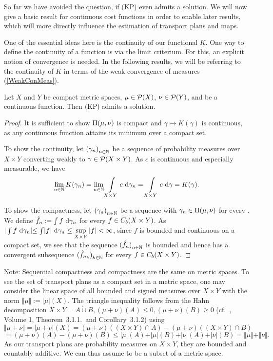 So far we have avoided the question, if (KP) even admits a solution. We will now give a basic result for continuous cost functions in order to enable later results, which will more directly influence the estimation of transport plans and maps.

One of the essential ideas here is the continuity of our functional $K$. One way to define the continuity of a function is via the limit criterium. For this, an explicit notion of convergence is needed. In the following results, we will be referring to the continuity of $K$ in terms of the weak convergence of measures (\ref{WeakConMeas}).

\begin{lemma}\label{KPAdmitCompCont}
	Let $X$ and $Y$ be compact metric spaces, $\mu \in \PM{X}$, $\nu \in \PM{Y}$, and  be a continuous function. Then$\text{\normalfont\ (KP)\,}$admits a solution.
\end{lemma}

\begin{proof}
	It is sufficient to show $\TP{\mu}{\nu}$ is compact and $\gamma \mapsto K(\gamma)$ is continuous, as any continuous function attains its minimum over a compact set.

	To show the continuity, let ${(\gamma_n)}_{\NinN}$ be a sequence of probability measures over $X \times Y$ converting weakly to $\gamma \in \PM{X \times Y}$. As $c$ is continuous and especially measurable, we have
	\[ \lim\limits_{\NinN} K(\gamma_n) = \lim\limits_{\NinN} \int\limits_{X \times Y} c~\D[\gamma_n] = \int\limits_{X \times Y} c~\D[\gamma] = K(\gamma). \] 
	
	To show the compactness, let ${(\gamma_n)}_{\NinN}$ be a sequence with $\gamma_n \in \TP{\mu}{\nu}$ for every \NinN. We define $\hat{f}_n := \int f~\D[\gamma_n]$ for every $f \in \CF[b]{X \times Y}$. As $\rvert \int f~\D[\gamma_n] \lvert \le \int \lvert f \rvert~\D[\gamma_n] \le \sup\limits_{X \times Y} |f| < \infty$, since $f$ is bounded and continuous on a compact set, we see that the sequence ${(\hat{f}_n)}_{\NinN}$ is bounded and hence has a convergent subsequence ${(\hat{f}_{n_k})}_{\NinN[k]}$ for every $f \in \CF[b]{X \times Y}$.
\end{proof}

Note: Sequential compactness and compactness are the same on metric spaces. To see the set of transport plans as a compact set in a metric space, one may consider the linear space of all bounded and signed measures over $X \times Y$ with the norm $\Vert \mu \Vert := |\mu|(X)$. The triangle inequality follows from the Hahn decomposition $X \times Y = A \dot{\cup} B, (\mu + \nu)(A) \le 0, (\mu + \nu)(B) \ge 0$ (cf.~\cite{Bog2007}, Volume 1, Theorem~3.1.1.~and Corollary~3.1.2) using
\[ \Vert \mu + \nu \Vert = \vert \mu + \nu \vert (X) = (\mu + \nu)((X \times Y) \cap A) - (\mu + \nu)((X \times Y) \cap B) \]
\[ = (\mu + \nu)(A) - (\mu + \nu)(B) \le \vert \mu \vert (A) + \vert \mu \vert (B) + \vert \nu \vert (A) + \vert \nu \vert (B) = \Vert \mu \Vert + \Vert \nu \Vert. \]
As our transport plans are probability measures on $X \times Y$, they are bounded and countably additive. We can thus assume \TP{\mu}{\nu} to be a subset of a metric space.

